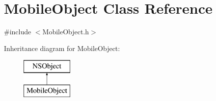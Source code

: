 \hypertarget{interface_mobile_object}{
\section{\-Mobile\-Object \-Class \-Reference}
\label{interface_mobile_object}
}


{\ttfamily \#include $<$\-Mobile\-Object.\-h$>$}

\-Inheritance diagram for \-Mobile\-Object\-:\begin{figure}[H]
\begin{center}
\leavevmode
\includegraphics[height=2.000000cm]{interface_mobile_object}
\end{center}
\end{figure}
